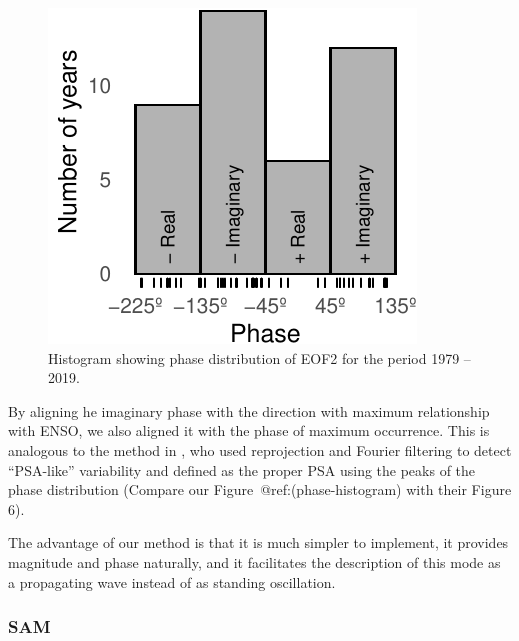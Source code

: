 \documentclass[smallextended]{svjour3}       %
\begin{document}
\begin{figure}
\centering
\includegraphics{../figures/phase-histogram-1.pdf}
\caption{\label{fig:phase-histogram}Histogram showing phase distribution of EOF2 for the period 1979 -- 2019.}
\end{figure}

By aligning he imaginary phase with the direction with maximum relationship with ENSO, we also aligned it with the phase of maximum occurrence. This is analogous to the method in \citet{irving2016}, who used reprojection and Fourier filtering to detect ``PSA-like'' variability and defined as the proper PSA using the peaks of the phase distribution (Compare our Figure~@ref:(phase-histogram) with their Figure 6).

The advantage of our method is that it is much simpler to implement, it provides magnitude and phase naturally, and it facilitates the description of this mode as a propagating wave instead of as standing oscillation.

\hypertarget{sam}{%
\subsubsection{SAM}\label{sam}}
\end{document}
